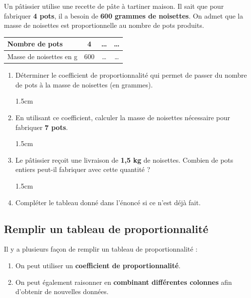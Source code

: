 \documentclass[a4paper]{book}
\begin{document}
    \begin{exemple}
        Un pâtissier utilise une recette de pâte à tartiner maison. Il sait que pour fabriquer \textbf{4 pots}, il a besoin de \textbf{600 grammes de noisettes}. On admet que la masse de noisettes est proportionnelle au nombre de pots produits.

        \begin{center}
            \begin{tabular}{|l|c|c|c|}
                \hline
                Nombre de pots           & 4    & \dots & \dots \\ \hline
                Masse de noisettes en g  & 600  & \dots & \dots \\ \hline
            \end{tabular}
        \end{center}
        
        \begin{enumerate}[leftmargin=*]
            \item Déterminer le coefficient de proportionnalité qui permet de passer du nombre de pots à la masse de noisettes (en grammes).

            \begin{ZoneReponse}{1.5cm}
            \end{ZoneReponse}
            
            \item En utilisant ce coefficient, calculer la masse de noisettes nécessaire pour fabriquer \textbf{7 pots}.

            \begin{ZoneReponse}{1.5cm}
            \end{ZoneReponse}
            
            \item Le pâtissier reçoit une livraison de \textbf{1,5 kg} de noisettes. Combien de pots entiers peut-il fabriquer avec cette quantité ?

            \begin{ZoneReponse}{1.5cm}
            \end{ZoneReponse}

            \item Compléter le tableau donné dans l'énoncé si ce n'est déjà fait.
        \end{enumerate}
    \end{exemple}


\newpage


\subsection{Remplir un tableau de proportionnalité}
    Il y a plusieurs façon de remplir un tableau de proportionnalité :
    \begin{enumerate}[leftmargin=*]
        \item[a)] On peut utiliser un \textbf{coefficient de proportionnalité}.
        \item[b)] On peut également raisonner en \textbf{combinant différentes colonnes} afin d'obtenir de nouvelles données.
    \end{enumerate}
\end{document}
